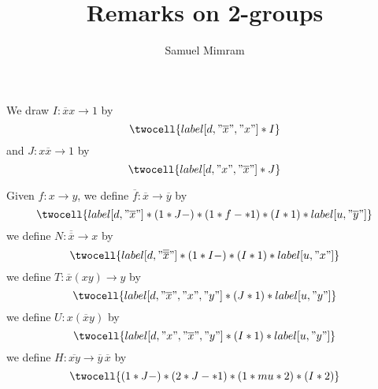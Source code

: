 \documentclass[a4paper]{article}
\title{Remarks on 2-groups}
\author{Samuel Mimram}
\newcommand{\ol}{\overline}
\begin{document}
\maketitle

We draw $I:\ol xx\to 1$ by
\[
  \twocell{label[d,"\ol x","x"] * I}
\]
and $J:x\ol x\to 1$ by
\[
  \twocell{label[d,"x","\ol x"] * J}
\]

\noindent
Given $f:x\to y$, we define $\ol f:\ol x\to\ol y$ by
\[
  \twocell{label[d,"\ol x"]*(1*J-)*(1*f-*1)*(I*1)*label[u,"\ol y"]}
\]
we define $N:\ol{\ol x}\to x$ by
\[
  \twocell{label[d,"\ol{\ol x}"]*(1*I-)*(I*1)*label[u,"x"]}
\]
we define $T:\ol x(xy)\to y$ by
\[
  \twocell{label[d,"\ol x","x","y"]*(J*1)*label[u,"y"]}
\]
we define $U:x(\ol xy)$ by
\[
  \twocell{label[d,"x","\ol x","y"]*(I*1)*label[u,"y"]}
\]
we define $H:\ol{xy}\to\ol y\,\ol x$ by
\[
  \twocell{(1*J-)*(2*J-*1)*(1*mu*2)*(I*2)}
\]
\end{document}

